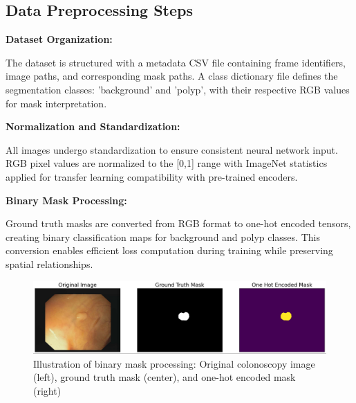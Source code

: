 \documentclass[a4paper,12pt]{report}
\begin{document}
\subsection{Data Preprocessing Steps}

\noindent\textbf{\large Dataset Organization:}
\vspace{0.5em}

The dataset is structured with a metadata CSV file containing frame identifiers, image paths, and corresponding mask paths. A class dictionary file defines the segmentation classes: 'background' and 'polyp', with their respective RGB values for mask interpretation.

\vspace{1em} %

\noindent\textbf{\large Normalization and Standardization:}
\vspace{0.5em}

All images undergo standardization to ensure consistent neural network input. RGB pixel values are normalized to the [0,1] range with ImageNet statistics applied for transfer learning compatibility with pre-trained encoders.

\vspace{1em} %

\noindent\textbf{\large Binary Mask Processing:}
\vspace{0.5em}

Ground truth masks are converted from RGB format to one-hot encoded tensors, creating binary classification maps for background and polyp classes. This conversion enables efficient loss computation during training while preserving spatial relationships.

\begin{figure}[h]
\centering
\includegraphics[width=\textwidth]{one_hot.png}
\caption{Illustration of binary mask processing: Original colonoscopy image (left), ground truth mask (center), and one-hot encoded mask (right)}
\label{fig:mask_processing}
\end{figure}
\end{document}
